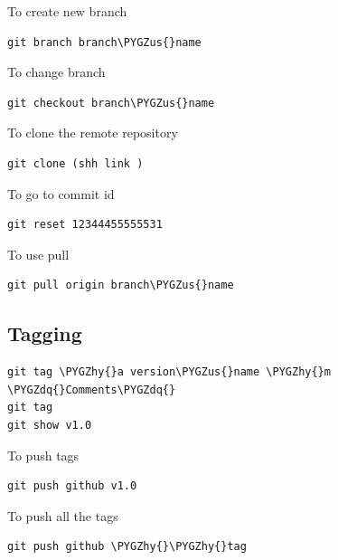 \documentclass[letterpaper,10pt,english]{sphinxmanual}
\def\PYGZus{\char`\_}
\def\PYGZhy{\char`\-}
\def\PYGZdq{\char`\"}
\begin{document}
To create new branch

\begin{Verbatim}[commandchars=\\\{\}]
git branch branch\PYGZus{}name
\end{Verbatim}

To change branch

\begin{Verbatim}[commandchars=\\\{\}]
git checkout branch\PYGZus{}name
\end{Verbatim}

To clone the remote repository

\begin{Verbatim}[commandchars=\\\{\}]
git clone (shh link )
\end{Verbatim}

To go to commit id

\begin{Verbatim}[commandchars=\\\{\}]
git reset 12344455555531
\end{Verbatim}

To use pull

\begin{Verbatim}[commandchars=\\\{\}]
git pull origin branch\PYGZus{}name
\end{Verbatim}


\subsection{Tagging}
\label{_source/things/git_commands:tagging}
\begin{Verbatim}[commandchars=\\\{\}]
git tag \PYGZhy{}a version\PYGZus{}name \PYGZhy{}m \PYGZdq{}Comments\PYGZdq{}
git tag
git show v1.0
\end{Verbatim}

To push tags

\begin{Verbatim}[commandchars=\\\{\}]
git push github v1.0
\end{Verbatim}

To push all the tags

\begin{Verbatim}[commandchars=\\\{\}]
git push github \PYGZhy{}\PYGZhy{}tag
\end{Verbatim}
\end{document}
